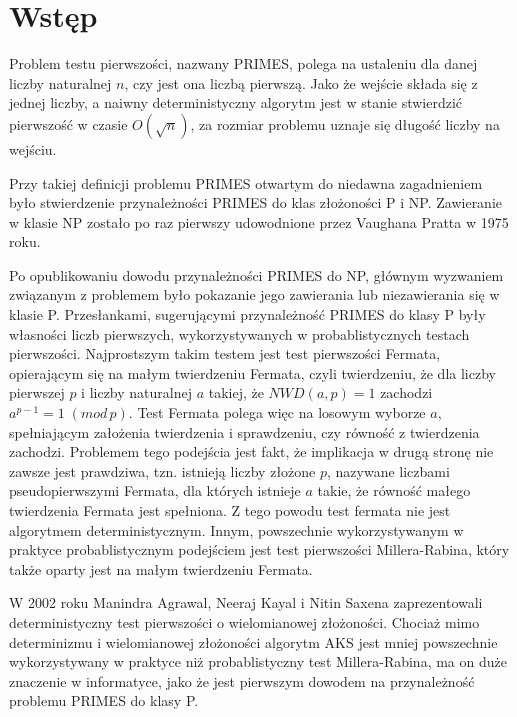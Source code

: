 \documentclass[polish,declaration,shortabstract]{iithesis}
\author         {Martyna Siejba}
\theoremstyle{definition}
\theoremstyle{remark} \newtheorem{observation}{Obserwacja}
\theoremstyle{plain} \newtheorem{theorem}{Twierdzenie}
\theoremstyle{plain} \newtheorem{lemma}{Lemat}
\theoremstyle{remark} \newtheorem*{remark*}{Uwaga}
\theoremstyle{reminder} \newtheorem*{reminder*}{Przypomnienie}
\begin{document}

\chapter{Wstęp}

Problem testu pierwszości, nazwany PRIMES, polega na ustaleniu dla danej liczby naturalnej $n$, czy jest ona liczbą pierwszą. Jako że wejście składa się z jednej liczby, a naiwny deterministyczny algorytm jest w stanie stwierdzić pierwszość w czasie $O(\sqrt{n})$, za rozmiar problemu uznaje się długość liczby na wejściu.

Przy takiej definicji problemu PRIMES otwartym do niedawna zagadnieniem było stwierdzenie przynależności PRIMES do klas złożoności P i NP. Zawieranie w klasie NP zostało po raz pierwszy udowodnione przez Vaughana Pratta w 1975 roku. 

Po opublikowaniu dowodu przynależności PRIMES do NP, głównym wyzwaniem związanym z problemem było pokazanie jego zawierania lub niezawierania się w klasie P. Przesłankami, sugerującymi przynależność PRIMES do klasy P były własności liczb pierwszych, wykorzystywanych w probablistycznych testach pierwszości. Najprostszym takim testem jest test pierwszości Fermata, opierającym się na małym twierdzeniu Fermata, czyli twierdzeniu, że dla liczby pierwszej $p$ i liczby naturalnej $a$ takiej, że $NWD(a, p) = 1$ zachodzi $a^{p-1} = 1 \; (mod \, p)$. Test Fermata polega więc na losowym wyborze $a$, spełniającym założenia twierdzenia i sprawdzeniu, czy równość z twierdzenia zachodzi. Problemem tego podejścia jest fakt, że implikacja w drugą stronę nie zawsze jest prawdziwa, tzn. istnieją liczby złożone $p$, nazywane liczbami pseudopierwszymi Fermata, dla których istnieje $a$ takie, że równość małego twierdzenia Fermata jest spełniona. Z tego powodu test fermata nie jest algorytmem deterministycznym. Innym, powszechnie wykorzystywanym w praktyce probablistycznym podejściem jest test pierwszości Millera-Rabina, który także oparty jest na małym twierdzeniu Fermata.

W 2002 roku Manindra Agrawal, Neeraj Kayal i Nitin Saxena zaprezentowali deterministyczny test pierwszości o wielomianowej złożoności. Chociaż mimo determinizmu i wielomianowej złożoności algorytm AKS jest mniej powszechnie wykorzystywany w praktyce niż probablistyczny test Millera-Rabina, ma on duże znaczenie w informatyce, jako że jest pierwszym dowodem na przynależność problemu PRIMES do klasy P.
\end{document}
